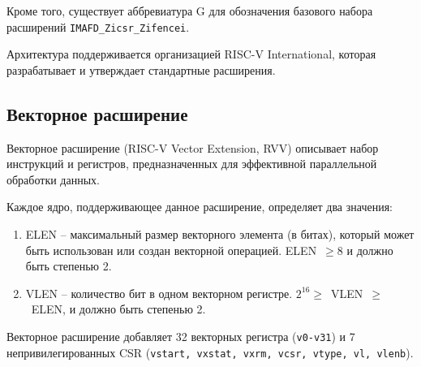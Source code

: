 Кроме того, существует аббревиатура G для обозначения базового набора расширений
\texttt{IMAFD\_Zicsr\_Zifencei}.

Архитектура поддерживается организацией RISC-V International, которая разрабатывает и
утверждает стандартные расширения.

\subsection {Векторное расширение}
\label{riscv:rvv}

Векторное расширение (RISC-V Vector Extension, RVV) описывает набор инструкций и
регистров, предназначенных для эффективной параллельной обработки данных.

Каждое ядро, поддерживающее данное расширение, определяет два значения:

\begin{enumerate}
	\item ELEN -- максимальный размер векторного элемента (в битах),
	который может быть использован или создан векторной операцией.
	ELEN~$\geq 8$ и должно быть степенью 2.

	\item VLEN -- количество бит в одном векторном регистре.
	$2^{16} \geq$~VLEN~$\geq$~ELEN, и должно быть степенью 2.
\end{enumerate}

Векторное расширение добавляет 32 векторных регистра (\texttt{v0-v31}) и 7
непривилегированных CSR (\texttt{vstart, vxstat, vxrm, vcsr, vtype, vl, vlenb}).


